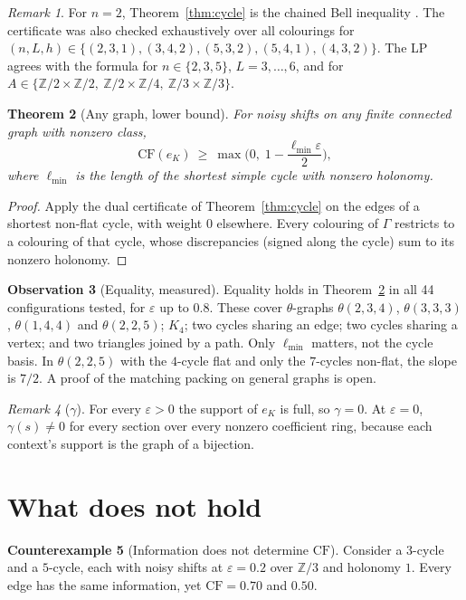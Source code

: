 \documentclass[11pt]{article}
\newtheorem{theorem}{Theorem}
\theoremstyle{definition}
\newtheorem{observation}[theorem]{Observation}
\newtheorem{counterexample}[theorem]{Counterexample}
\theoremstyle{remark}
\newtheorem{remark}[theorem]{Remark}
\newcommand{\Z}{\mathbb{Z}}
\newcommand{\CF}{\mathrm{CF}}
\newcommand{\lmin}{\ell_{\min}}
\begin{document}
\begin{remark}
For $n=2$, Theorem~\ref{thm:cycle} is the chained Bell inequality \cite{bc90}. The certificate was also checked exhaustively over all colourings for $(n,L,h)\in\{(2,3,1),(3,4,2),(5,3,2),(5,4,1),(4,3,2)\}$. The LP agrees with the formula for $n\in\{2,3,5\}$, $L=3,\dots,6$, and for $A\in\{\Z/2\times\Z/2,\ \Z/2\times\Z/4,\ \Z/3\times\Z/3\}$.
\end{remark}

\begin{theorem}[Any graph, lower bound]\label{thm:graph}
For noisy shifts on any finite connected graph with nonzero class,
\[
\CF(e_K)\ \ge\ \max\!\Big(0,\;1-\frac{\lmin\varepsilon}{2}\Big),
\]
where $\lmin$ is the length of the shortest simple cycle with nonzero holonomy.
\end{theorem}
\begin{proof}
Apply the dual certificate of Theorem~\ref{thm:cycle} on the edges of a shortest non-flat cycle, with weight $0$ elsewhere. Every colouring of $\Gamma$ restricts to a colouring of that cycle, whose discrepancies (signed along the cycle) sum to its nonzero holonomy.
\end{proof}

\begin{observation}[Equality, measured]\label{obs:equality}
Equality holds in Theorem~\ref{thm:graph} in all 44 configurations tested, for $\varepsilon$ up to $0.8$. These cover $\theta$-graphs $\theta(2,3,4)$, $\theta(3,3,3)$, $\theta(1,4,4)$ and $\theta(2,2,5)$; $K_4$; two cycles sharing an edge; two cycles sharing a vertex; and two triangles joined by a path. Only $\lmin$ matters, not the cycle basis. In $\theta(2,2,5)$ with the $4$-cycle flat and only the $7$-cycles non-flat, the slope is $7/2$. A proof of the matching packing on general graphs is open.
\end{observation}

\begin{remark}[$\gamma$]
For every $\varepsilon>0$ the support of $e_K$ is full, so $\gamma=0$. At $\varepsilon=0$, $\gamma(s)\ne0$ for every section over every nonzero coefficient ring, because each context's support is the graph of a bijection.
\end{remark}

\section{What does not hold}

\begin{counterexample}[Information does not determine $\CF$]\label{ce:info}
Consider a $3$-cycle and a $5$-cycle, each with noisy shifts at $\varepsilon=0.2$ over $\Z/3$ and holonomy $1$. Every edge has the same information, yet $\CF=0.70$ and $0.50$.
\end{counterexample}
\end{document}

